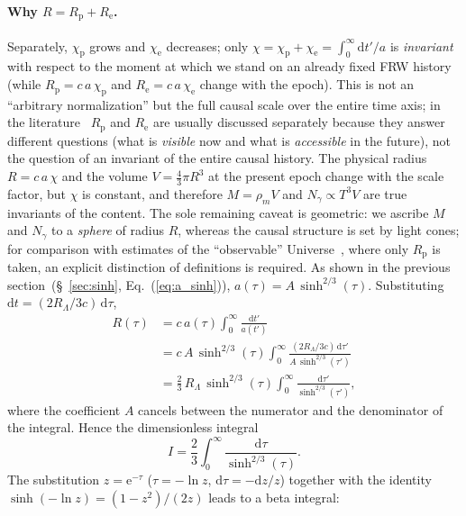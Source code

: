 \documentclass[10pt,a4paper]{article}
\begin{document}
\paragraph{Why $R = R_{\mathrm{p}}+R_{\mathrm{e}}$.} Separately, $\chi_{\mathrm{p}}$ grows and $\chi_{\mathrm{e}}$ decreases; only $\chi=\chi_{\mathrm{p}}+\chi_{\mathrm{e}}=\int_0^{\infty}\mathrm{d}t'/a$ is \emph{invariant} with respect to the moment at which we stand on an already fixed FRW history (while $R_{\mathrm{p}}=c\,a\,\chi_{\mathrm{p}}$ and $R_{\mathrm{e}}=c\,a\,\chi_{\mathrm{e}}$ change with the epoch). This is not an ``arbitrary normalization'' but the full causal scale over the entire time axis; in the literature~\cite{Davis2004} $R_{\mathrm{p}}$ and $R_{\mathrm{e}}$ are usually discussed separately because they answer different questions (what is \emph{visible} now and what is \emph{accessible} in the future), not the question of an invariant of the entire causal history. The physical radius $R=c\,a\,\chi$ and the volume $V=\tfrac{4}{3}\pi R^3$ at the present epoch change with the scale factor, but $\chi$ is constant, and therefore $M=\rho_m V$ and $N_\gamma\propto T^3 V$ are true invariants of the content. The sole remaining caveat is geometric: we ascribe $M$ and $N_\gamma$ to a \emph{sphere} of radius $R$, whereas the causal structure is set by light cones; for comparison with estimates of the ``observable'' Universe~\cite{EganLineweaver2010}, where only $R_{\mathrm{p}}$ is taken, an explicit distinction of definitions is required.
As shown in the previous section~(\S~\ref{sec:sinh}, Eq.~(\ref{eq:a_sinh})), $a(\tau)=A\,\sinh^{2/3}(\tau)$. Substituting $\mathrm{d}t=(2R_\Lambda/3c)\,\mathrm{d}\tau$,
\begin{equation}
\begin{aligned}
R(\tau) &= c\,a(\tau)\int_0^{\infty}\frac{\mathrm{d}t'}{a(t')} \\
&= c\,A\,\sinh^{2/3}(\tau)\int_0^{\infty}\frac{(2R_\Lambda/3c)\,\mathrm{d}\tau'}{A\,\sinh^{2/3}(\tau')} \\
&= \frac{2}{3}\,R_\Lambda\,\sinh^{2/3}(\tau)
   \int_0^{\infty}\frac{\mathrm{d}\tau'}{\sinh^{2/3}(\tau')},
\end{aligned}
\end{equation}
where the coefficient $A$ cancels between the numerator and the denominator of the integral. Hence the dimensionless integral
\begin{equation}
I = \frac{2}{3}\int_0^{\infty}\frac{\mathrm{d}\tau}{\sinh^{2/3}(\tau)}.
\end{equation}
The substitution $z=\mathrm{e}^{-\tau}$ ($\tau=-\ln z$, $\mathrm{d}\tau=-\mathrm{d}z/z$) together with the identity $\sinh(-\ln z)=(1-z^2)/(2z)$ leads to a beta integral:
\end{document}

